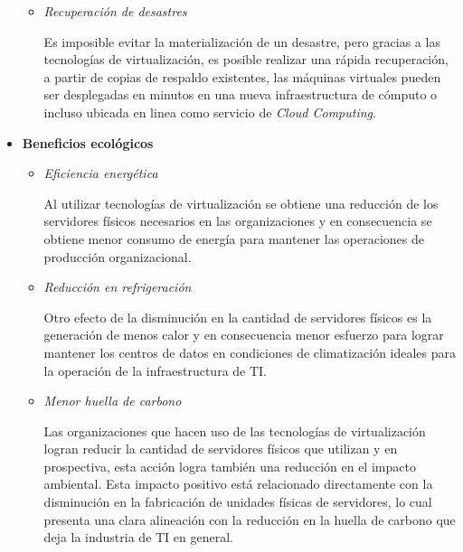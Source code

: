 \begin{itemize}
\begin{itemize}
		\item \textit{Recuperación de desastres}\vspace{3mm}
		
		Es imposible evitar la materialización de un desastre, pero gracias a las tecnologías de virtualización, es posible realizar una rápida recuperación, a partir de copias de respaldo existentes, las máquinas virtuales pueden ser desplegadas en minutos en una nueva infraestructura de cómputo o incluso ubicada en linea como servicio de \textit{Cloud Computing}.\\
		
	\end{itemize}
	\item \textbf{Beneficios ecológicos}\\
	\begin{itemize}
		
		\item \textit{Eficiencia energética}\vspace{3mm}
		
		Al utilizar tecnologías de virtualización se obtiene una reducción de los servidores físicos necesarios en las organizaciones y en consecuencia se obtiene menor consumo de energía para mantener las operaciones de producción organizacional. \\
		
		\item \textit{Reducción en refrigeración}\vspace{3mm}
		
		Otro efecto de la disminución en la cantidad de servidores físicos es la generación de menos calor y en consecuencia menor esfuerzo para lograr mantener los centros de datos en condiciones de climatización ideales para la operación de la infraestructura de TI.\\
		
		\item \textit{Menor huella de carbono}\vspace{3mm}
		
		Las organizaciones que hacen uso de las tecnologías de virtualización logran reducir la cantidad de servidores físicos que utilizan y en prospectiva, esta acción logra también una reducción en el impacto ambiental. Esta impacto positivo está relacionado directamente con la disminución en la fabricación de unidades físicas de servidores, lo cual presenta una clara alineación con la reducción en la huella de carbono que deja la industria de TI en general.\\
	\end{itemize}
\end{itemize}

